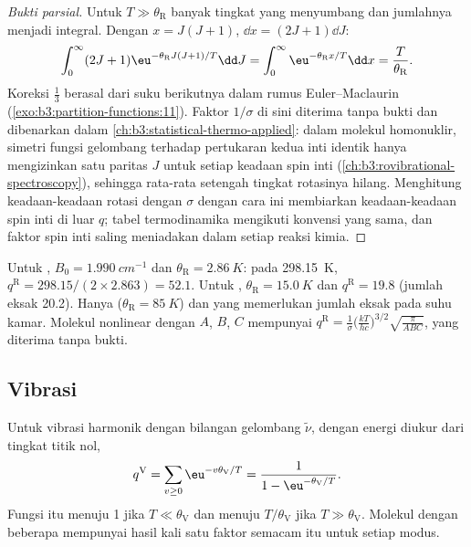 \begin{proof}[Bukti parsial]
Untuk $T \gg \theta_{\mathrm R}$ banyak tingkat yang menyumbang dan jumlahnya
menjadi integral. Dengan $x = J(J+1)$, $\dd x = (2J+1)\dd J$:
\[
  \int_0^\infty(2J+1)\eu^{-\theta_{\mathrm R}J(J+1)/T}\dd J = \int_0^\infty\eu^{-\theta_{\mathrm R}x/T}\dd x
  = \frac{T}{\theta_{\mathrm R}}.
\]
Koreksi $\frac13$ berasal dari suku berikutnya dalam rumus Euler--Maclaurin
(\cref{exo:b3:partition-functions:11}). Faktor $1/\sigma$ di sini diterima tanpa
bukti dan dibenarkan dalam \cref{ch:b3:statistical-thermo-applied}: dalam
molekul homonuklir, simetri fungsi gelombang terhadap pertukaran kedua inti
identik hanya mengizinkan satu paritas $J$ untuk setiap keadaan spin inti
(\cref{ch:b3:rovibrational-spectroscopy}), sehingga rata-rata setengah
tingkat rotasinya hilang. Menghitung keadaan-keadaan rotasi dengan $\sigma$
dengan cara ini membiarkan keadaan-keadaan spin inti di luar $q$; tabel
termodinamika mengikuti konvensi yang sama, dan faktor spin inti saling
meniadakan dalam setiap reaksi kimia.
\end{proof}

Untuk , $B_0 = \qty{1.990}{cm^{-1}}$ dan $\theta_{\mathrm R} = \qty{2.86}{K}$: pada
\qty{298.15}{K}, $q^{\mathrm R} = 298.15/(2\times2.863) = 52.1$. Untuk ,
$\theta_{\mathrm R} = \qty{15.0}{K}$ dan $q^{\mathrm R} = 19.8$ (jumlah eksak 20.2). Hanya
 ($\theta_{\mathrm R} = \qty{85}{K}$) dan  yang
memerlukan jumlah eksak pada suhu kamar. Molekul nonlinear dengan  $A$, $B$, $C$ mempunyai $q^{\mathrm R} = \frac{1}{\sigma}\bigl(\frac{kT}{hc}\bigr)^{3/2}\sqrt{\frac{\pi}{ABC}}$,
yang diterima tanpa bukti.

\subsection*{Vibrasi}

\begin{proposition}\label{prop:b3:partition-functions:q-vib}
Untuk vibrasi harmonik dengan bilangan gelombang $\tilde\nu$, dengan energi
diukur dari tingkat titik nol,
\[
  q^{\mathrm V} = \sum_{v\ge0}\eu^{-v\theta_{\mathrm V}/T} = \frac{1}{1 - \eu^{-\theta_{\mathrm V}/T}} .
\]
Fungsi itu menuju 1 jika $T \ll \theta_{\mathrm V}$ dan menuju $T/\theta_{\mathrm V}$ jika
$T \gg \theta_{\mathrm V}$. Molekul dengan beberapa  mempunyai hasil
kali satu faktor semacam itu untuk setiap modus.
\end{proposition}

